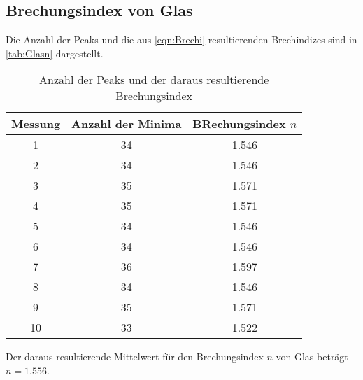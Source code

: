 \subsection{Brechungsindex von Glas}
\label{sec:AuswGlas}
Die Anzahl der Peaks und die aus \autoref{eqn:Brechi} resultierenden Brechindizes sind in \autoref{tab:Glasn} dargestellt.
\begin{table}
    \centering
    \caption{Anzahl der Peaks und der daraus resultierende Brechungsindex}
    \begin{tabular}{c c c}
        \toprule
        Messung & Anzahl der Minima & BRechungsindex $n$ \\
        \midrule
             1 & 34 & 1.546\\
             2 & 34 & 1.546\\
             3 & 35 & 1.571\\
             4 & 35 & 1.571\\
             5 & 34 & 1.546\\
             6 & 34 & 1.546\\
             7 & 36 & 1.597\\
             8 & 34 & 1.546\\
             9 & 35 & 1.571\\
            10 & 33 & 1.522\\
            \bottomrule
    \end{tabular}
    \label{tab:Glasn}
\end{table}
Der daraus resultierende Mittelwert für den Brechungsindex $n$ von Glas beträgt $n=1.556$.